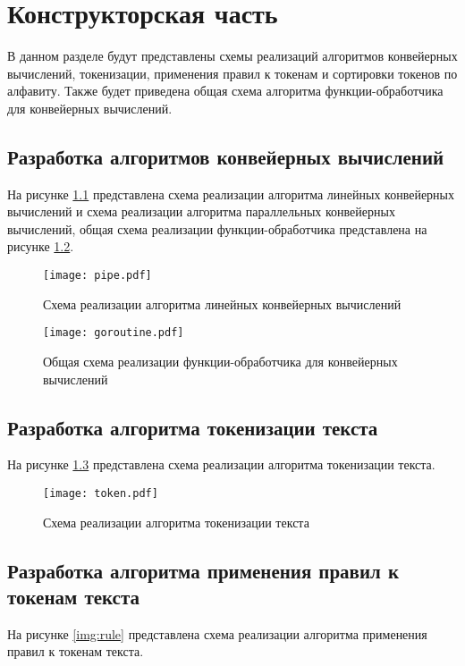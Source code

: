 \chapter{Конструкторская часть}

В данном разделе будут представлены схемы реализаций алгоритмов конвейерных вычислений, токенизации, применения правил к токенам и сортировки токенов по алфавиту. Также будет приведена общая схема алгоритма функции-обработчика для конвейерных вычислений.

\section{Разработка алгоритмов конвейерных вычислений}
На рисунке \ref{img:pipe} представлена схема реализации алгоритма линейных конвейерных вычислений и схема реализации алгоритма параллельных конвейерных вычислений, общая схема реализации функции-обработчика представлена на рисунке \ref{img:goroutine}. 

\begin{figure}[h!]
    \centering
    \texttt{[image: pipe.pdf]}
    \caption{Схема реализации алгоритма линейных конвейерных вычислений}
    \label{img:pipe}
\end{figure}

\begin{figure}[h!]
    \centering
    \texttt{[image: goroutine.pdf]}
    \caption{Общая схема реализации функции-обработчика для конвейерных вычислений}
    \label{img:goroutine}
\end{figure}

\section{Разработка алгоритма токенизации текста}
На рисунке \ref{img:token} представлена схема реализации алгоритма токенизации текста.

\begin{figure}[h!]
    \centering
    \texttt{[image: token.pdf]}
    \caption{Схема реализации алгоритма токенизации текста}
    \label{img:token}
\end{figure}

\section{Разработка алгоритма применения правил к токенам текста}
На рисунке \ref{img:rule} представлена схема реализации алгоритма применения правил к токенам текста. 


